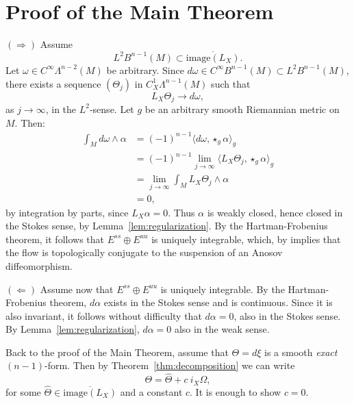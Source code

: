 \documentclass[11pt,letterpaper,reqno,abstract=true]{scrartcl}
\theoremstyle{plain}                              %
\theoremstyle{definition}                         %
\theoremstyle{remark}                             %
\begin{document}

    
\section{Proof of the Main Theorem}
\label{sec:proof}

$(\Rightarrow)$ Assume
%
\begin{displaymath}
  L^2 B^{n-1}(M) \subset
  \overline{\text{image}(L_X)}.
\end{displaymath}
%
Let $\omega \in C^\infty \Lambda^{n-2}(M)$ be arbitrary. Since
$d\omega \in C^\infty B^{n-1}(M) \subset L^2 B^{n-1}(M)$, there
exists a sequence
$(\Theta_j)$ in $C^1_X \Lambda^{n-1}(M)$ such that
%
\begin{displaymath}
  L_X \Theta_j \to d\omega,
\end{displaymath}
%
as $j \to \infty$, in the $L^2$-sense. Let $g$ be an arbitrary smooth
Riemannian metric on $M$. Then:
%
\begin{align*}
  \int_M d\omega \wedge \alpha & = (-1)^{n-1} \langle d\omega, \star_g
                                 \alpha \rangle_g \\
  & = (-1)^{n-1} \lim_{j \to \infty}  \langle L_X \Theta_j, \star_g \alpha
    \rangle_g \\
                               & = \lim_{j \to \infty} \int_M L_X
                                 \Theta_j \wedge \alpha \\
                               & = 0,
\end{align*}
%
by integration by parts, since $L_X \alpha = 0$. Thus $\alpha$ is
weakly closed, hence closed in the Stokes sense, by
Lemma~\ref{lem:regularization}. By the Hartman-Frobenius theorem, it
follows that $E^{ss} \oplus E^{uu}$ is uniquely integrable, which, by
\cite{plante72} implies that the flow is topologically conjugate to
the suspension of an Anosov diffeomorphism.

\medskip

\noindent $(\Leftarrow)$ Assume now that $E^{ss} \oplus E^{uu}$ is
uniquely integrable. By the Hartman-Frobenius theorem, $d\alpha$
exists in the Stokes sense and is continuous. Since it is also
invariant, it follows without difficulty that $d\alpha = 0$, also in
the Stokes sense. By Lemma~\ref{lem:regularization}, $d \alpha = 0$
also in the weak sense.

Back to the proof of the Main Theorem, assume that $\Theta = d\xi$ is
a smooth \emph{exact} $(n-1)$-form. Then by
Theorem~\ref{thm:decomposition} we can write
%
\begin{displaymath}
  \Theta = \hat{\Theta} + c \: i_X \Omega,
\end{displaymath}
%
for some $\hat{\Theta} \in \overline{\text{image}(L_X)}$ and a
constant $c$. It is enough to show $c = 0$.
\end{document}
